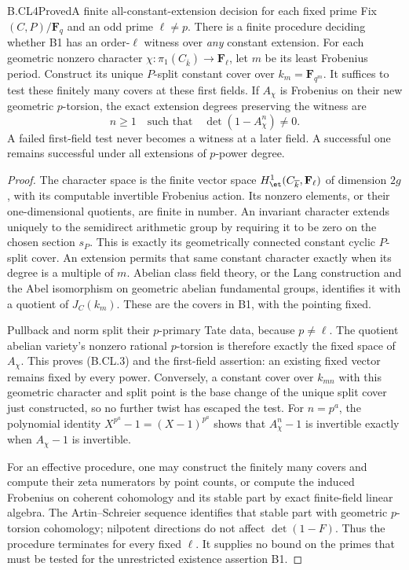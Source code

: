 \begin{claim}{B.CL4}{Proved}{A finite all-constant-extension decision for each fixed prime}
Fix $(C,P)/\mathbf F_q$ and an odd prime $\ell\ne p$.
There is a finite procedure deciding whether B1 has an
order-$\ell$ witness over \emph{any} constant extension.
For each geometric nonzero character
$\chi:\pi_1(C_{\overline k})\to\mathbf F_\ell$, let $m$
be its least Frobenius period. Construct its unique $P$-split
constant cover over $k_m=\mathbf F_{q^m}$. It suffices to test
these finitely many covers at these first fields. If $A_\chi$
is Frobenius on their new geometric $p$-torsion, the exact
extension degrees preserving the witness are
\[
  n\ge1\quad\text{such that}\quad
                  \det(1-A_\chi^n)\ne0.                \tag{B.CL.3}
\]
A failed first-field test never becomes a witness at a later
field. A successful one remains successful under all
extensions of $p$-power degree.
\end{claim}
\begin{proof}
The character space is the finite vector space
$H^1_{\et}(C_{\overline k},\mathbf F_\ell)$ of dimension
$2g$, with its computable invertible Frobenius action.
Its nonzero elements, or their one-dimensional quotients,
are finite in number. An invariant character extends uniquely
to the semidirect arithmetic group by requiring it to be zero
on the chosen section $s_P$. This is exactly its geometrically
connected constant cyclic $P$-split cover. An extension permits
that same constant character exactly when its degree is a
multiple of $m$. Abelian class field theory, or the Lang
construction and the Abel isomorphism on geometric abelian
fundamental groups, identifies it with a quotient of
$J_C(k_m)$. These are the covers in B1, with the pointing fixed.

Pullback and norm split their $p$-primary Tate data, because
$p\ne\ell$. The quotient abelian variety's nonzero rational
$p$-torsion is therefore exactly the fixed space of $A_\chi$.
This proves (B.CL.3) and the first-field assertion: an existing
fixed vector remains fixed by every power. Conversely, a
constant cover over $k_{mn}$ with this geometric character and
split point is the base change of the unique split cover just
constructed, so no further twist has escaped the test.
For $n=p^a$, the polynomial identity
$X^{p^a}-1=(X-1)^{p^a}$ shows that $A_\chi^n-1$ is
invertible exactly when $A_\chi-1$ is invertible.

For an effective procedure, one may construct the finitely
many covers and compute their zeta numerators by point counts,
or compute the induced Frobenius on coherent cohomology and
its stable part by exact finite-field linear algebra. The
Artin--Schreier sequence identifies that stable part with
geometric \(p\)-torsion cohomology; nilpotent directions do
not affect $\det(1-F)$. Thus the procedure terminates for
every fixed $\ell$. It supplies no bound on the primes that
must be tested for the unrestricted existence assertion B1.
\end{proof}

